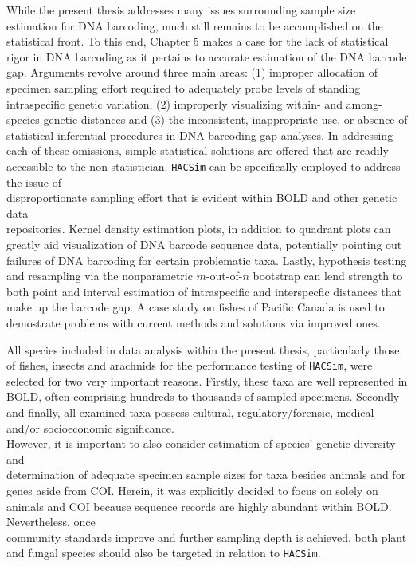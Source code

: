 While the present thesis addresses many issues surrounding sample size estimation for DNA barcoding, much still remains to be accomplished on the statistical front.  To this end, Chapter 5 makes a case for the lack of statistical rigor in DNA barcoding as it pertains to accurate estimation of the DNA barcode gap. Arguments revolve around three main areas: (1) improper allocation of specimen sampling effort required to adequately probe levels of standing intraspecific genetic variation, (2) improperly visualizing within- and among-species genetic distances and (3) the inconsistent, inappropriate use, or absence of statistical inferential procedures in DNA barcoding gap analyses. In addressing each of these omissions, simple statistical solutions are offered that are readily accessible to the non-statistician. {\tt HACSim} can be specifically employed to address the issue of \\ disproportionate sampling effort that is evident within BOLD and other genetic data \\ repositories. Kernel density estimation plots, in addition to quadrant plots can greatly aid visualization of DNA barcode sequence data, potentially pointing out failures of DNA barcoding for certain problematic taxa. Lastly, hypothesis testing and resampling via the nonparametric $m$-out-of-$n$ bootstrap can lend strength to both point and interval estimation of intraspecific and interspecfic distances that make up the barcode gap. A case study on fishes of Pacific Canada is used to demostrate problems with current methods and solutions via improved ones.

All species included in data analysis within the present thesis, particularly those of fishes, insects and arachnids for the performance testing of {\tt HACSim}, were selected for two very important reasons. Firstly, these taxa are well represented in BOLD, often comprising hundreds to thousands of sampled specimens. Secondly and finally, all examined taxa possess cultural, regulatory/forensic, medical and/or socioeconomic significance. \\ However, it is important to also consider estimation of species' genetic diversity and \\ determination of adequate specimen sample sizes for taxa besides animals and for genes aside from COI. Herein, it was explicitly decided to focus on solely on animals and COI because sequence records are highly abundant within BOLD. Nevertheless, once \\ community standards improve and further sampling depth is achieved, both plant and fungal species should also be targeted in relation to {\tt HACSim}.  

  


